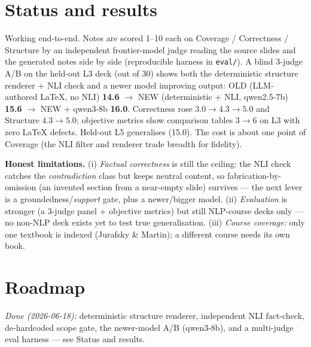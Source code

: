 \documentclass[11pt,a4paper]{article}
\begin{document}
\section{Status and results}

Working end-to-end. Notes are scored 1--10 each on Coverage / Correctness / Structure by an independent
frontier-model judge reading the source slides and the generated notes side by side (reproducible harness in
\texttt{eval/}). A blind 3-judge A/B on the held-out L3 deck (out of 30) shows both the deterministic
structure renderer + NLI check and a newer model improving output: OLD (LLM-authored LaTeX, no NLI)
\textbf{14.6} $\rightarrow$ NEW (deterministic + NLI, qwen2.5-7b) \textbf{15.6} $\rightarrow$
NEW + qwen3-8b \textbf{16.0}. Correctness rose $3.0\to4.3\to5.0$ and Structure $4.3\to5.0$; objective metrics
show comparison tables $3\to6$ on L3 with zero LaTeX defects. Held-out L5 generalises (15.0). The cost is
about one point of Coverage (the NLI filter and renderer trade breadth for fidelity).

\textbf{Honest limitations.} (i) \emph{Factual correctness} is still the ceiling: the NLI check catches the
\emph{contradiction} class but keeps neutral content, so fabrication-by-omission (an invented section from a
near-empty slide) survives --- the next lever is a groundedness/\emph{support} gate, plus a newer/bigger
model. (ii) \emph{Evaluation} is stronger (a 3-judge panel + objective metrics) but still NLP-course decks
only --- no non-NLP deck exists yet to test true generalisation. (iii) \emph{Course coverage:} only one
textbook is indexed (Jurafsky \& Martin); a different course needs its own book.

\section{Roadmap}

\emph{Done (2026-06-18):} deterministic structure renderer, independent NLI fact-check, de-hardcoded scope
gate, the newer-model A/B (qwen3-8b), and a multi-judge eval harness --- see Status and results.
\end{document}
